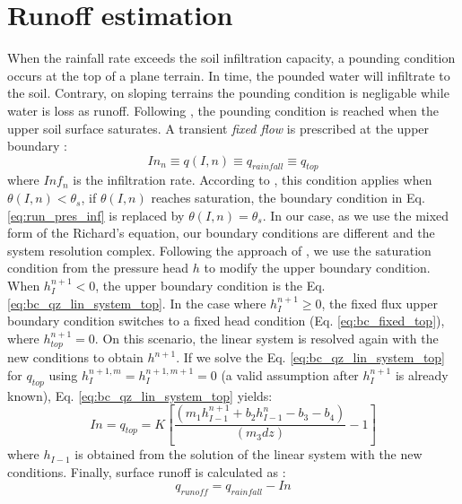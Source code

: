 \documentclass[a4paper,12pt]{article}
\begin{document}
\section{Runoff estimation}
When the rainfall rate exceeds the soil infiltration capacity, a pounding condition occurs at the top of a plane terrain. In time, the pounded water will infiltrate to the soil. Contrary, on sloping terrains the pounding condition is negligable while water is loss as runoff. Following \cite{Herradaetal2014}, the pounding condition is reached when the upper soil surface saturates.
A transient \emph{fixed flow} is prescribed at the upper boundary \citep{Herradaetal2014}:
 \begin{equation} \label{eq:run_pres_inf}
 	In_{n} \equiv q(I,n) \equiv q_{rainfall} \equiv q_{top}
\end{equation}
where $Inf_n$ is the infiltration rate.
According to \cite{Herradaetal2014}, this condition applies when $\theta(I,n)<\theta_s$, if $\theta(I,n)$ reaches saturation, the boundary condition in Eq. \ref{eq:run_pres_inf} is replaced by $\theta(I,n)=\theta_s$.
In our case, as we use the mixed form of the Richard's equation, our boundary conditions are different and the system resolution complex. Following the approach of \cite{Herradaetal2014}, we use the saturation condition from the pressure head $h$ to modify the upper boundary condition. When $h_I^{n+1}<0$, the upper boundary condition is the Eq. \ref{eq:bc_qz_lin_system_top}. In the case where $h_I^{n+1}\geq0$, the fixed flux upper boundary condition switches to a fixed head condition (Eq. \ref{eq:bc_fixed_top}), where $h_{top}^{n+1}=0$. On this scenario, the linear system is resolved again with the new conditions to obtain $h^{n+1}$.
If we solve the Eq. \ref{eq:bc_qz_lin_system_top} for $q_{top}$ using $h_I^{n+1,m}=h_I^{n+1,m+1}=0$ (a valid assumption after $h_I^{n+1}$ is already known), Eq. \ref{eq:bc_qz_lin_system_top} yields:
\begin{equation} \label{eq:run_pres_inf}
 	In=q_{top}=K\left[\frac{\left( m_1h_{I-1}^{n+1}+b_2h_{I-1}^n-b_3-b_4\right) }{\left( m_3dz\right) }-1 \right] 
\end{equation}
where $h_{I-1}$ is obtained from the solution of the linear system with the new conditions.
Finally, surface runoff is calculated as \citep{Herradaetal2014}:
\begin{equation} \label{eq:run_run}
    q_{runoff}=q_{rainfall}-In
\end{equation}
\end{document}
